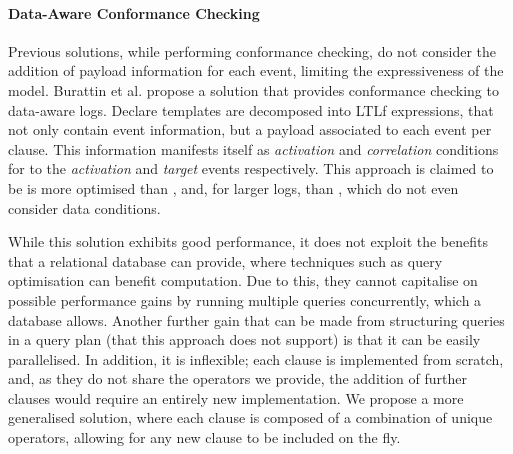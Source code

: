 \paragraph*{Data-Aware Conformance Checking}
Previous solutions, while performing conformance checking, do not consider the addition of payload information for each event, limiting the expressiveness of the model. Burattin et al. \cite{BurattinMS16} propose a solution that provides conformance checking to data-aware logs. Declare templates are decomposed into LTLf expressions, that not only contain event information, but a payload associated to each event per clause. This information manifests itself as \emph{activation} and \emph{correlation} conditions for to the \emph{activation} and \emph{target} events respectively. This approach is claimed to be is more optimised than \cite{VanDerAalst2005}, and, for larger logs, than \cite{Burattin2012}, which do not even consider data conditions. 

While this solution exhibits good performance, it does not exploit the benefits that a relational database can provide, where techniques such as query optimisation can benefit computation. Due to this, they cannot capitalise on possible performance gains by running multiple queries concurrently, which a database allows. Another further gain that can be made from structuring queries in a query plan (that this approach does not support) is that it can be easily parallelised. In addition, it is inflexible; each clause is implemented from scratch, and, as they do not share the operators we provide, the addition of further clauses would require an entirely new implementation. We propose a more generalised solution, where each clause is composed of a combination of unique operators, allowing for any new clause to be included on the fly. 

